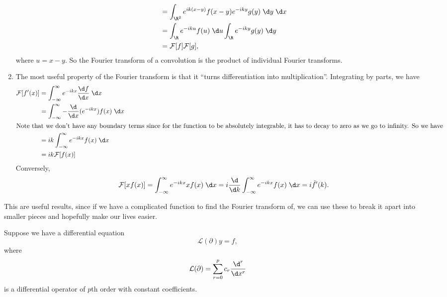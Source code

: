 \documentclass[a4paper]{article}
\begin{document}
\begin{enumerate}
\begin{align*}
      &= \int_{\R^2} e^{ik(x - y)} f(x - y) e^{-iky}g(y) \;\d y \;\d x\\
      &= \int_{\R} e^{-iku} f(u) \;\d u \int_{\R} e^{-iky} g(y)\;\d y\\
      &= \mathcal{F}[f] \mathcal{F}[g],
    \end{align*}
    where $u = x - y$. So the Fourier transform of a convolution is the product of individual Fourier transforms.
  \item The most useful property of the Fourier transform is that it ``turns differentiation into multiplication''. Integrating by parts, we have
    \begin{align*}
      \mathcal{F}[f'(x)] &= \int_{-\infty}^\infty e^{-ikx} \frac{\d f}{\d x}\;\d x\\
      &= \int_{-\infty}^\infty - \frac{\d}{\d x} (e^{-ikx}) f(x)\;\d x\\
      \intertext{Note that we don't have any boundary terms since for the function to be absolutely integrable, it has to decay to zero as we go to infinity. So we have}
      &= ik \int_{-\infty}^\infty e^{-ikx} f(x)\;\d x\\
      &= ik \mathcal{F}[f(x)]
    \end{align*}
    Conversely,
    \[
      \mathcal{F}[xf(x)] = \int_{-\infty}^\infty e^{-ikx} xf(x)\;\d x = i \frac{\d}{\d k}\int_{-\infty}^{\infty} e^{-ikx} f(x)\;\d x = i\tilde{f}'(k).
    \]
\end{enumerate}
This are useful results, since if we have a complicated function to find the Fourier transform of, we can use these to break it apart into smaller pieces and hopefully make our lives easier.

Suppose we have a differential equation
\[
  \mathcal{L}(\partial) y = f,
\]
where
\[
  \mathcal{L}(\partial) = \sum_{r = 0}^p c_r \frac{\d^r}{\d x^r}
\]
is a differential operator of $p$th order with constant coefficients.
\end{document}
